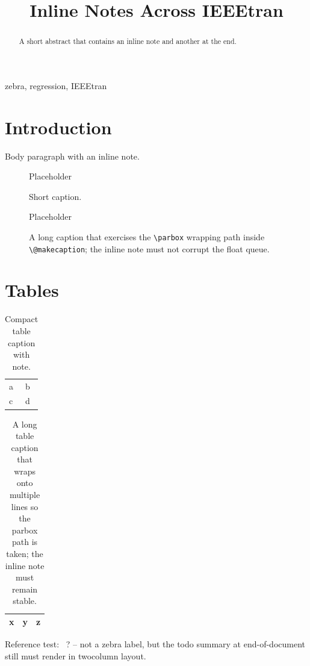 \documentclass[conference]{IEEEtran}
\begin{document}
\title{Inline Notes Across IEEEtran}
\author{}
\maketitle

\begin{abstract}
 A short abstract that contains an inline note
 and another at the end.
\end{abstract}

\begin{IEEEkeywords}
zebra, regression, IEEEtran
\end{IEEEkeywords}

\section{Introduction}
\label{sec:intro}
Body paragraph with an inline  note. \lipsum[1][1-3]

\begin{figure}[t]
  \centering Placeholder
  \caption{Short caption.}
  \label{fig:short}
\end{figure}

\begin{figure}[t]
  \centering Placeholder
  \caption{A long caption that exercises the \texttt{\textbackslash parbox}
    wrapping path inside \texttt{\textbackslash @makecaption}; the inline
    note must not corrupt the float queue.}
  \label{fig:wide}
\end{figure}

\section{Tables}
\begin{table}[t]
  \centering
  \caption{Compact table caption with note.}
  \label{tab:compact}
  \begin{tabular}{ll}\hline a & b \\ c & d \\\hline\end{tabular}
\end{table}

\begin{table}[t]
  \centering
  \caption{A long table caption that wraps onto multiple lines so the
    parbox path is taken; the inline note must remain stable.}
  \label{tab:wide}
  \begin{tabular}{lll}\hline x & y & z \\\hline\end{tabular}
\end{table}

\lipsum[2-3]

Reference test: ~? -- not a zebra label, but the
todo summary at end-of-document still must render in twocolumn layout.
\end{document}

